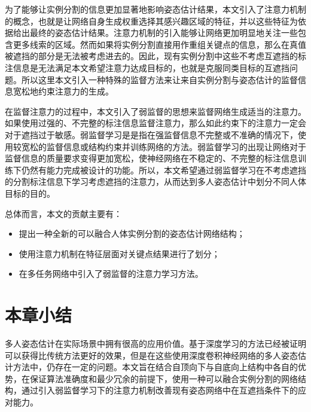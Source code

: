 为了能够让实例分割的信息更加显著地影响姿态估计结果，本文引入了注意力机制的概念，也就是让网络自身生成权重选择其感兴趣区域的特征，并以这些特征为依据给出最终的姿态估计结果。注意力机制的引入能够让网络更加明显地关注一些包含更多线索的区域。然而如果将实例分割直接用作重组关键点的信息，那么在真值被遮挡的部分是无法被考虑进去的。因此，现有实例分割中这些不考虑互遮挡的标注信息是无法满足本文希望注意力达成目标的，也就是克服同类目标的互遮挡问题。所以这里本文引入一种特殊的监督方法来让来自实例分割与姿态估计的监督信息宽松地约束注意力的生成。

在监督注意力的过程中，本文引入了弱监督的思想来监督网络生成适当的注意力。如果使用过强的、不完整的标注信息监督注意力，那么如此约束下的注意力一定会对于遮挡过于敏感。弱监督学习是是指在强监督信息不完整或不准确的情况下，使用较宽松的监督信息或结构约束并训练网络的方法\cite{10.1093/nsr/nwx106}。弱监督学习的出现让网络对于监督信息的质量要求变得更加宽松，使神经网络在不稳定的、不完整的标注信息训练下仍然有能力完成被设计的功能。所以，本文希望通过弱监督学习在不考虑遮挡的分割标注信息下学习考虑遮挡的注意力，从而达到多人姿态估计中划分不同人体目标的目的。

总体而言，本文的贡献主要有：
\begin{itemize}
	\item 提出一种全新的可以融合人体实例分割的姿态估计网络结构；
	\item 使用注意力机制在特征层面对关键点结果进行了划分；
	\item 在多任务网络中引入了弱监督的注意力学习方法。
\end{itemize}

\section{本章小结}
\label{sec:introconclusion}
多人姿态估计在实际场景中拥有很高的应用价值。基于深度学习的方法已经被证明可以获得比传统方法更好的效果，但是在这些使用深度卷积神经网络的多人姿态估计方法中，仍存在一定的问题。本文旨在结合自顶向下与自底向上结构中各自的优势，在保证算法准确度和最少冗余的前提下，使用一种可以融合实例分割的网络结构，通过引入弱监督学习下的注意力机制改善现有姿态网络中在互遮挡条件下的应对能力。